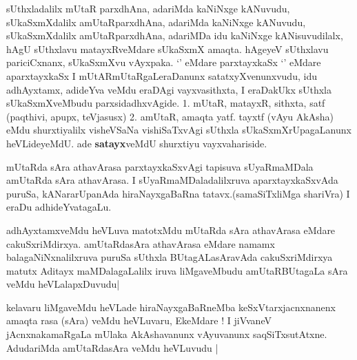 \begin{artha}
sUthxladalilx mUtaR parxdhAna, adariMda kaNiNxge kANuvudu,
sUkaSxmXdalilx amUtaRparxdhAna, adariMda kaNiNxge kANuvudu,
sUkaSxmXdalilx amUtaRparxdhAna, adariMDa idu kaNiNxge kANisuvudilalx,
hAgU sUthxlavu matayxRveMdare sUkaSxmX amaqta. hAgeyeV sUthxlavu
pariciCxnanx, sUkaSxmXvu vAyxpaka. {`\stext'} eMdare parxtayxkaSx
{`\stext'}  eMdare aparxtayxkaSx I mUtARmUtaRgaLeraDanunx
satatxyXvenunxvudu, idu adhAyxtamx, adideYva veMdu eraDAgi
vayxvasithxta, I eraDakUkx sUthxla sUkaSxmXveMbudu parxsidadhxvAgide.
1. mUtaR, matayxR, sithxta, satf (paqthivi, apupx, teVjasusx)
2. amUtaR, amaqta yatf. tayxtf (vAyu AkAsha)
eMdu shurxtiyalilx visheVSaNa vishiSaTxvAgi sUthxla
sUkaSxmXrUpagaLanunx heVLideyeMdU. ade \textbf{satayx}veMdU shurxtiyu vayxvahariside.
\end{artha}

\begin{center}


\end{center}


\begin{artha}
mUtaRda sAra athavArasa parxtayxkaSxvAgi tapisuva sUyaRmaMDala
amUtaRda sAra athavArasa. I sUyaRmaMDaladalilxruva aparxtayxkaSxvAda
puruSa, kANararUpanAda hiraNayxgaBaRna tatavx.(samaSiTxliMga shariVra)
I eraDu adhideYvatagaLu.

adhAyxtamxveMdu heVLuva matotxMdu mUtaRda sAra athavArasa eMdare
cakuSxriMdirxya. amUtaRdasAra athavArasa eMdare namamx
balagaNiNxnalilxruva puruSa sUthxla BUtagALasAravAda cakuSxriMdirxya
matutx Aditayx maMDalagaLalilx iruva liMgaveMbudu amUtaRBUtagaLa sAra
veMdu heVLalapxDuvudu|
\end{artha}

\begin{center}


\end{center}


\begin{artha}
kelavaru liMgaveMdu heVLade hiraNayxgaBaRneMba keSxVtarxjacnxnanenx
amaqta rasa (sAra) veMdu heVLuvaru, EkeMdare ! I jiVvaneV
jAcnxnakamaRgaLa mUlaka AkAshavanunx vAyuvanunx
saqSiTxsutAtxne. AdudariMda amUtaRdasAra veMdu heVLuvudu |
\end{artha}


